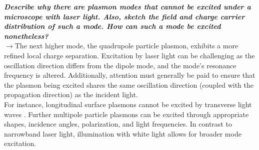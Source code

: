 \textbf{\textit{Describe why there are plasmon modes that cannot be excited under a microscope with laser light. 
Also, sketch the field and charge carrier distribution of such a mode. How can such a mode be excited nonetheless?}}\\
$\rightarrow$The next higher mode, the quadrupole particle plasmon, exhibits a more refined local charge separation. 
Excitation by laser light can be challenging as the oscillation direction differs from the dipole mode, and the mode's 
resonance frequency is altered. Additionally, attention must generally be paid to ensure that the plasmon being excited 
shares the same oscillation direction (coupled with the propagation direction) as the incident light. \\
For instance, longitudinal surface plasmons cannot be excited by transverse light waves \cite{FZV2p2}. 
Further multipole particle plasmons can be excited through appropriate shapes, incidence angles, polarization, 
and light frequencies. In contrast to narrowband laser light, illumination with white light allows for broader mode excitation. \\